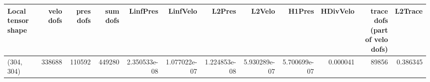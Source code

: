 \begin{tabular}{lrrrrrrrrrrr}
\toprule
Local tensor shape &  velo dofs &  pres dofs &  sum dofs &     LinfPres &     LinfVelo &       L2Pres &       L2Velo &       H1Pres &  HDivVelo &  trace dofs (part of velo dofs) &  L2Trace \\
\midrule
        (304, 304) &     338688 &     110592 &    449280 & 2.350533e-08 & 1.077022e-07 & 1.224853e-08 & 5.930289e-07 & 5.700699e-07 &  0.000041 &                           89856 & 0.386345 \\
\bottomrule
\end{tabular}
